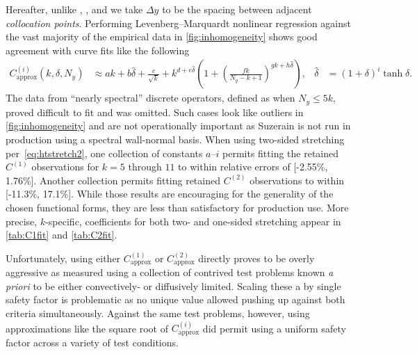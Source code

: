 \documentclass[letterpaper,11pt,nointlimits,reqno,draft]{amsbook}
\begin{document}
Hereafter, unlike \citeauthor{Guarini1998}, \citeauthor{Kwok2002}, and
\citeauthor{Venugopal2003} we take $\Delta{}y$ to be the spacing between
adjacent \emph{collocation points}.  Performing Levenberg--Marquardt nonlinear
regression against the vast majority of the empirical data in
\autoref{fig:inhomogeneity} shows good agreement with curve fits like the
following
\begin{align}
  \label{eq:Cfit}
  C_\text{approx}^{(i)}\!\left(k,\delta,N_y\right)
  &\approx
    a k
  + b \hat\delta
  + \frac{c}{\sqrt{k}}
  + k^{d + e \hat\delta} \left(
        1 + \left(\frac{f k}{N_y - k + 1}\right)^{g k + h \hat\delta}
    \right)
  ,
  &
  \hat\delta &= \left(1+\delta\right)^i \tanh \delta
  .
\end{align}
The data from ``nearly spectral'' discrete operators, defined as when $N_y \leq
5 k$, proved difficult to fit and was omitted.  Such cases look like outliers
in \autoref{fig:inhomogeneity} and are not operationally important as
Suzerain is not run in production using a spectral wall-normal basis.  When
using two-sided stretching per~\eqref{eq:htstretch2}, one collection of
constants $a$--$i$ permits fitting the retained $C^{(1)}$ observations for
$k=5$ through $11$ to within relative errors of [-2.55\%, 1.76\%].  Another
collection permits fitting retained $C^{(2)}$ observations to within [-11.3\%,
17.1\%].  While those results are encouraging for the generality of the chosen
functional forms, they are less than satisfactory for production use.  More
precise, $k$-specific, coefficients for both two- and one-sided stretching
appear in \autoref{tab:C1fit} and \autoref{tab:C2fit}.

Unfortunately, using either $C_\text{approx}^{(1)}$ or $C_\text{approx}^{(2)}$
directly proves to be overly aggressive as measured using a collection of
contrived test problems known \emph{a priori} to be either convectively- or
diffusively limited.  Scaling these a by single safety factor is problematic as no
unique value allowed pushing up against both criteria simultaneously.  Against
the same test problems, however, using approximations like the square root of
$C_\text{approx}^{(i)}$ did permit using a uniform safety factor across a
variety of test conditions.
\end{document}

